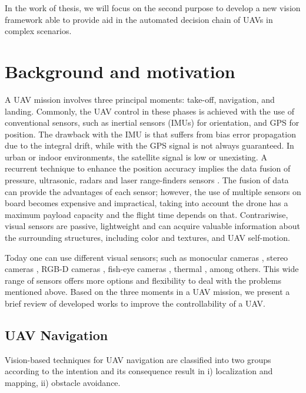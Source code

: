 In the work of thesis, we will focus on the second purpose to develop a new vision framework able to provide aid in the automated decision chain of UAVs in complex scenarios.

\section{Background and motivation}\label{sec:background & motivation}

A UAV mission involves three principal moments: take-off, navigation, and landing. Commonly, the UAV  control in these phases is achieved with the use of conventional sensors, such as inertial sensors (IMUs) for orientation, and GPS for position. The drawback with the IMU is that suffers from bias error propagation due to the integral drift, while with the GPS signal is not always guaranteed. In urban or indoor environments, the satellite signal is low or unexisting. A recurrent technique to enhance the position accuracy implies the data fusion of pressure, ultrasonic, radars and laser range-finders sensors \cite{Tomic.Schmid.ea:IRAM:2012}. The fusion of data can provide the advantages of each sensor; however, the use of multiple sensors on board becomes expensive and impractical, taking into account the drone has a maximum payload capacity and the flight time depends on that. Contrariwise, visual sensors are passive, lightweight and can acquire valuable information about the surrounding structures, including color and textures, and UAV self-motion. 

Today one can use different visual sensors; such as monocular cameras \cite{Padhy.Xia.ea:TSC:2018}, stereo cameras \cite{Seitz.Curless.ea:CVPR:2006}, RGB-D cameras \cite{Huang.Bachrach.ea:RobR:2017}, fish-eye cameras \cite{Hrabar.Sukhatme:IROS:2004}, thermal \cite{Gaszczak.Breckon.ea:IRCV:2011}, among others. This wide range of sensors offers more options and flexibility to deal with the problems mentioned above. Based on the three moments in a UAV mission, we present a brief review of developed works to improve the controllability of a UAV. 

\subsection{UAV Navigation}
Vision-based techniques for UAV navigation are classified into two groups according to the intention and its consequence result in i) localization and mapping, ii) obstacle avoidance.

